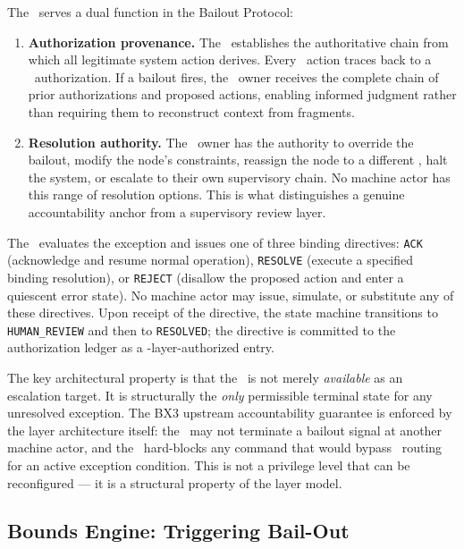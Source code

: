 The \purpose\ serves a dual function in the Bailout Protocol:

\begin{enumerate}
\item \textbf{Authorization provenance.} The \purpose\ establishes the authoritative chain from which all legitimate system action derives. Every \bounds\ action traces back to a \purpose\ authorization. If a bailout fires, the \purpose\ owner receives the complete chain of prior authorizations and proposed actions, enabling informed judgment rather than requiring them to reconstruct context from fragments.
\item \textbf{Resolution authority.} The \purpose\ owner has the authority to override the bailout, modify the node's constraints, reassign the node to a different \bounds, halt the system, or escalate to their own supervisory chain. No machine actor has this range of resolution options. This is what distinguishes a genuine accountability anchor from a supervisory review layer.
\end{enumerate}

The \purpose\ evaluates the exception and issues one of three binding directives: \texttt{ACK} (acknowledge and resume normal operation), \texttt{RESOLVE} (execute a specified binding resolution), or \texttt{REJECT} (disallow the proposed action and enter a quiescent error state). No machine actor may issue, simulate, or substitute any of these directives. Upon receipt of the directive, the state machine transitions to \texttt{HUMAN\_REVIEW} and then to \texttt{RESOLVED}; the directive is committed to the authorization ledger as a \purpose-layer-authorized entry.

The key architectural property is that the \purpose\ is not merely \textit{available} as an escalation target. It is structurally the \textit{only} permissible terminal state for any unresolved exception. The BX3 upstream accountability guarantee is enforced by the layer architecture itself: the \bounds\ may not terminate a bailout signal at another machine actor, and the \fact\ hard-blocks any command that would bypass \purpose\ routing for an active exception condition. This is not a privilege level that can be reconfigured --- it is a structural property of the layer model.

\subsection{Bounds Engine: Triggering Bail-Out}
\label{sec:bounds-trigger}

